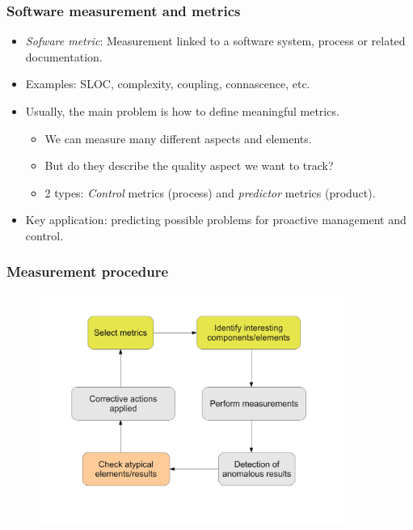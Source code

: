 \documentclass{beamer}
\begin{document}
\begin{frame}
 \frametitle{Software measurement and metrics}
 \begin{itemize}
 \item \textit{Sofware metric}: Measurement linked to a software system, process or related documentation.
 \item Examples: SLOC, complexity, coupling, connascence, etc.
 \item Usually, the main problem is how to define meaningful metrics.
  \begin{itemize}
   \item We can measure many different aspects and elements.
   \item But do they describe the quality aspect we want to track?
   \item 2 types: \textit{Control} metrics (process) and \textit{predictor} metrics (product).
  \end{itemize}
  \item Key application: predicting possible problems for proactive management and control.
 \end{itemize}
\end{frame}


\begin{frame}
\frametitle{Measurement procedure}
\begin{center}
\begin{figure}
 \includegraphics[height=7.5cm]{figs/quality-measurement.pdf}
\end{figure}
\end{center}
\end{frame}

\end{document}
